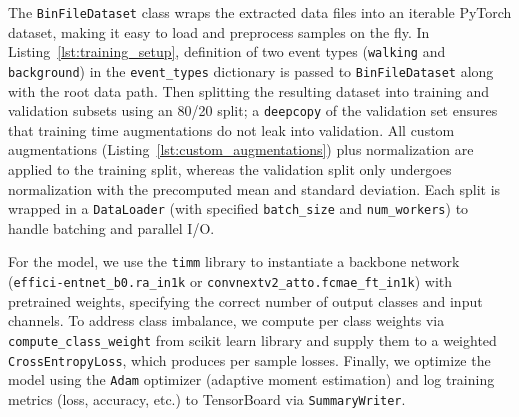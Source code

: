 The \texttt{BinFileDataset} class wraps the extracted data files into an iterable PyTorch dataset, making it easy to load and preprocess samples on the fly.  In Listing~\ref{lst:training_setup}, definition of two event types (\texttt{walking} and \texttt{background}) in the \texttt{event\_types} dictionary is passed to \texttt{BinFileDataset} along with the root data path. Then splitting the resulting dataset into training and validation subsets using an 80/20 split; a \texttt{deepcopy} of the validation set ensures that training time augmentations do not leak into validation.  All custom augmentations (Listing~\ref{lst:custom_augmentations}) plus normalization are applied to the training split, whereas the validation split only undergoes normalization with the precomputed mean and standard deviation.  Each split is wrapped in a \texttt{DataLoader} (with specified \texttt{batch\_size} and \texttt{num\_workers}) to handle batching and parallel I/O.

For the model, we use the \texttt{timm} library to instantiate a backbone network  (\texttt{effici\allowbreak-entnet\_b0.ra\_in1k} or \texttt{convnextv2\_atto.fcmae\_ft\_in1k}) with pretrained weights, specifying the correct number of output classes and input channels. To address class imbalance, we compute per class weights via \texttt{compute\_class\_weight} from scikit learn library  and supply them to a weighted \texttt{CrossEntropyLoss}, which produces per sample losses.  Finally, we optimize the model using the \texttt{Adam} optimizer (adaptive moment estimation) and log training metrics (loss, accuracy, etc.) to TensorBoard via \texttt{SummaryWriter}.


